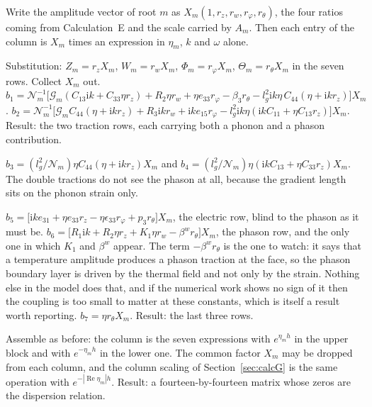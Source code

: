 \documentclass[11pt]{article}
\makeatletter
\newif\ifshowworked
\newenvironment{worked}{%
  \ifshowworked\par\smallskip\noindent\textit{Working.}\par\smallskip\else
  \setbox\z@\vbox\bgroup\fi}{\ifshowworked\par\smallskip\else\egroup\fi}
\newcommand{\ii}{\mathrm{i}}
\newcommand{\Ncal}{\mathcal{N}}
\newcommand{\Gcal}{\mathcal{G}}
\makeatother
\begin{document}
Write the amplitude vector of root $m$ as $X_m(1,r_z,r_w,r_\varphi,r_\theta)$, the four ratios coming from
Calculation~E and the scale carried by $A_m$. Then each entry of the column is $X_m$ times an expression in
$\eta_m$, $k$ and $\omega$ alone.

\begin{worked}
Substitution: $Z_m=r_zX_m$, $W_m=r_wX_m$, $\Phi_m=r_\varphi X_m$, $\Theta_m=r_\theta X_m$ in the seven
rows. Collect $X_m$ out.
$b_1=\Ncal_m^{-1}\bigl[\Gcal_m(C_{13}\ii k+C_{33}\eta r_z)+R_2\eta r_w+\eta e_{33}r_\varphi-\beta_3r_\theta
-l_g^2\ii k\eta\,C_{44}(\eta+\ii kr_z)\bigr]X_m$.
$b_2=\Ncal_m^{-1}\bigl[\Gcal_mC_{44}(\eta+\ii kr_z)+R_3\ii kr_w+\ii ke_{15}r_\varphi
-l_g^2\ii k\eta(\ii kC_{11}+\eta C_{13}r_z)\bigr]X_m$.
Result: the two traction rows, each carrying both a phonon and a phason contribution.
\end{worked}

\begin{worked}
$b_3=(l_g^2/\Ncal_m)\eta C_{44}(\eta+\ii kr_z)X_m$ and
$b_4=(l_g^2/\Ncal_m)\eta(\ii kC_{13}+\eta C_{33}r_z)X_m$. The double tractions do not see the phason at
all, because the gradient length sits on the phonon strain only.
\end{worked}

\begin{worked}
$b_5=\bigl[\ii ke_{31}+\eta e_{33}r_z-\eta\epsilon_{33}r_\varphi+p_3r_\theta\bigr]X_m$, the electric row,
blind to the phason as it must be.
$b_6=\bigl[R_1\ii k+R_2\eta r_z+K_1\eta r_w-\beta^{w}r_\theta\bigr]X_m$, the phason row, and the only one
in which $K_1$ and $\beta^{w}$ appear. The term $-\beta^{w}r_\theta$ is the one to watch: it says that a
temperature amplitude produces a phason traction at the face, so the phason boundary layer is driven by
the thermal field and not only by the strain. Nothing else in the model does that, and if the numerical
work shows no sign of it then the coupling is too small to matter at these constants, which is itself a
result worth reporting.
$b_7=\eta r_\theta X_m$. Result: the last three rows.
\end{worked}

\begin{worked}
Assemble as before: the column is the seven expressions with $e^{\eta_mh}$ in the upper block and with
$e^{-\eta_mh}$ in the lower one. The common factor $X_m$ may be dropped from each column, and the column
scaling of Section~\ref{sec:calcG} is the same operation with $e^{-|\operatorname{Re}\eta_m|h}$. Result: a
fourteen-by-fourteen matrix whose zeros are the dispersion relation.
\end{worked}
\end{document}
